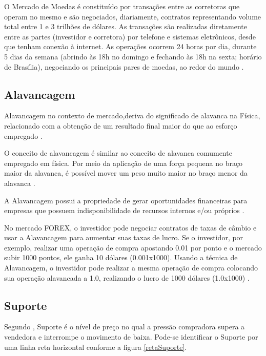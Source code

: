 O Mercado de Moedas é constituído por transações entre as corretoras que operam no mesmo e são negociados, diariamente, contratos representando volume total entre 1 e 3 trilhões de dólares. As transações são realizadas diretamente entre as partes (investidor e corretora) por telefone e sistemas eletrônicos, desde que tenham conexão à internet. As operações ocorrem 24 horas por dia, durante 5 dias da semana (abrindo às 18h no domingo e fechando às 18h na sexta; horário de Brasília), negociando os principais pares de moedas, ao redor do mundo \cite[pág.~4]{cvm2009}.

\subsection{Alavancagem}
Alavancagem no contexto de mercado,deriva do significado de alavanca na Física, relacionado com a obtenção de um resultado final maior do que ao esforço empregado \cite[pág.~3]{dantas2006}.

\begin{citacao}
O conceito de alavancagem é similar ao conceito de alavanca comumente empregado em física. Por meio da aplicação de uma força pequena no braço maior da alavanca, é possível mover um peso muito maior no braço menor da alavanca \cite[pág.~232]{bruni2011}.
\end{citacao}

A Alavancagem possui a propriedade de gerar oportunidades financeiras para empresas que possuem indisponibilidade de recursos internos e/ou próprios \cite[p~13]{albuquerque2013}.

No mercado FOREX, o investidor pode negociar contratos de taxas de câmbio e usar a Alavancagem para aumentar suas taxas de lucro. Se o investidor, por exemplo, realizar uma operação de compra apostando 0.01 por ponto e o mercado subir 1000 pontos, ele ganha 10 dólares (0.001x1000). Usando a técnica de Alavancagem, o investidor pode realizar a mesma operação de compra colocando sua operação alavancada a 1.0, realizando o lucro de 1000 dólares (1.0x1000) \cite{easyforex2014}.

\subsection{Suporte}

Segundo ,  Suporte é o nível de preço no qual a pressão compradora supera a vendedora e interrompe o movimento de baixa. Pode-se identificar o Suporte por uma linha reta horizontal conforme a figura \ref{retaSuporte}.

